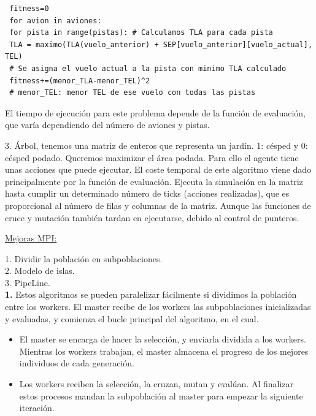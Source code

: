	\begin{lstlisting}
 fitness=0
 for avion in aviones:
 for pista in range(pistas): # Calculamos TLA para cada pista
 TLA = maximo(TLA(vuelo_anterior) + SEP[vuelo_anterior][vuelo_actual], TEL)
 # Se asigna el vuelo actual a la pista con minimo TLA calculado
 fitness+=(menor_TLA-menor_TEL)^2
 # menor_TEL: menor TEL de ese vuelo con todas las pistas		
	\end{lstlisting}
	
	El tiempo de ejecución para este problema depende de la función de evaluación, que varía dependiendo del número de aviones y pistas. 
	
	3. Árbol, tenemos una matriz de enteros que representa un jardín. 1: césped y                 0: césped podado. Queremos maximizar el área podada. Para ello el agente tiene unas acciones que puede ejecutar.
	El coste temporal de este algoritmo viene dado principalmente por la función de evaluación. Ejecuta la simulación en la matriz hasta cumplir un determinado número de ticks (acciones realizadas), que es proporcional al número de filas y columnas de la matriz. Aunque las funciones de cruce y mutación también tardan en ejecutarse, debido al control de punteros.
	
	\underline{Mejoras MPI:}
	
	1. Dividir la población en subpoblaciones.\\
	2. Modelo de islas.\\
	3. PipeLine.\\
	
	\textbf{1.} Estos algoritmos se pueden paralelizar fácilmente si dividimos la población entre los workers. El master recibe de los workers las subpoblaciones inicializadas y evaluadas, y comienza el bucle principal del algoritmo, en el cual. 
	\begin{itemize}
		\item El master se encarga de hacer la selección, y enviarla dividida a los workers. Mientras los workers trabajan, el master almacena el progreso de los mejores individuos de cada generación.
		\item Los workers reciben la selección, la cruzan, mutan y evalúan. Al finalizar estos procesos mandan la subpoblación al master para empezar la siguiente iteración.
	\end{itemize}
	
